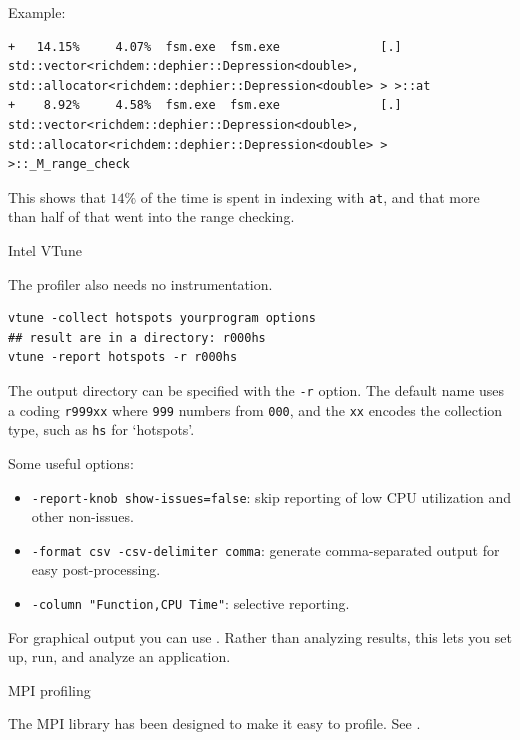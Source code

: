 Example:
\begin{lstlisting}[language=shell]
+   14.15%     4.07%  fsm.exe  fsm.exe              [.] std::vector<richdem::dephier::Depression<double>, std::allocator<richdem::dephier::Depression<double> > >::at
+    8.92%     4.58%  fsm.exe  fsm.exe              [.] std::vector<richdem::dephier::Depression<double>, std::allocator<richdem::dephier::Depression<double> > >::_M_range_check
\end{lstlisting}
This shows that $14\%$ of the time is spent in indexing with \lstinline{at},
and that more than half of that went into the range checking.

 {Intel VTune}


The  profiler also needs no instrumentation.
\begin{lstlisting}[language=shell]
vtune -collect hotspots yourprogram options
## result are in a directory: r000hs
vtune -report hotspots -r r000hs
\end{lstlisting}
The output directory can be specified with the \lstinline{-r} option.
The default name uses a coding \lstinline{r999xx}
where \lstinline{999} numbers from \lstinline{000},
and the \lstinline{xx} encodes the collection type,
such as \lstinline{hs} for `hotspots'.

Some useful options:
\begin{itemize}
\item \lstinline{-report-knob show-issues=false}: skip reporting of
  low CPU utilization and other non-issues.
\item \lstinline{-format csv -csv-delimiter comma}:
  generate comma-separated output for easy post-processing.
\item \lstinline{-column "Function,CPU Time"}: selective reporting.
\end{itemize}


For graphical output you can use .
Rather than analyzing results, this lets you set up, run,
and analyze an application.


 {MPI profiling}

The MPI library has been designed to make it easy to profile.
See .

